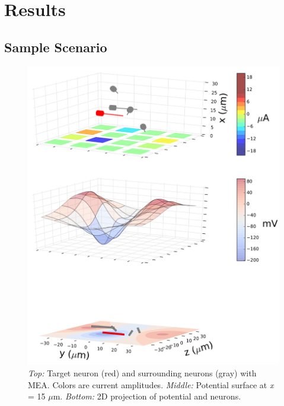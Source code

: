\documentclass[conference]{IEEEtran}
\begin{document}
\section{Results\label{sec:Results}}


\subsection{Sample Scenario}

\begin{figure}
\begin{centering}
\includegraphics[width=\linewidth]{figure_1_crop.pdf}
\par\end{centering}

\caption{\label{fig:neurons_and_field}\emph{Top:} Target neuron (red) and
surrounding neurons (gray) with MEA. Colors are current amplitudes.
\emph{Middle:} Potential surface at \emph{x }= 15 $\mu$m.
\emph{Bottom: }2D projection of potential and neurons.}
\end{figure}
\end{document}
